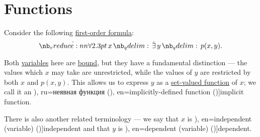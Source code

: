 \section{Functions}\label{sec:functions}

\begin{concept}\label{con:variable_dependence}
  Consider the following \hyperref[def:first_order_syntax/formula]{first-order formula}:
  \begin{equation*}
    \qforall x \qexists y p(x, y).
  \end{equation*}

  Both \hyperref[con:variable]{variables} here are \hyperref[con:variable_binding]{bound}, but they have a fundamental distinction --- the values which \( x \) may take are unrestricted, while the values of \( y \) are restricted by both \( x \) and \( p(x, y) \). This allows us to express \( y \) as a \hyperref[def:function]{set-valued function} of \( x \); we call it an \term[bg=неявна функция (\cite[377]{Тагамлицки1971ДиференциалноСмятане}), ru=неявная функция (\cite[314]{Фихтенгольц1968ОсновыАнализаТом2}), en=implicitly-defined function (\cite[29]{DontchevRockafellar2014SolutionMappings})]{implicit function}.

  There is also another related terminology --- we say that \( x \) is \term[ru=независимая (переменная) (\cite[145]{АлександровМаркушевичХинчинИПр1952ЭнциклопедияТом3}), en=independent (variable) (\cite[74]{Kleene2002Logic})]{independent} and that \( y \) is \term[ru=зависимая (переменная) (\cite[145]{АлександровМаркушевичХинчинИПр1952ЭнциклопедияТом3}), en=dependent (variable) (\cite[74]{Kleene2002Logic})]{dependent}.
\end{concept}

